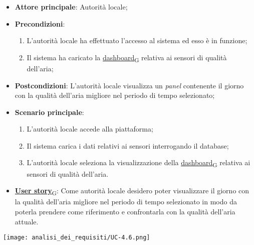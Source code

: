\begin{itemize}
	\item \textbf{Attore principale}: Autorità locale;
	\item \textbf{Precondizioni}:
	      \begin{enumerate}
		      \item L'autorità locale ha effettuato l'accesso al sistema ed esso è in funzione;
		      \item Il sistema ha caricato la \href{https://7last.github.io/docs/rtb/documentazione-interna/glossario\#dashboard}{dashboard\textsubscript{G}} relativa ai sensori di qualità dell'aria;
	      \end{enumerate}
	\item \textbf{Postcondizioni}: L'autorità locale visualizza un \textit{panel} contenente il giorno con la qualità dell'aria migliore nel periodo di tempo selezionato;
	\item \textbf{Scenario principale}:
	      \begin{enumerate}
		      \item L'autorità locale accede alla piattaforma;
		      \item Il sistema carica i dati relativi ai sensori interrogando il database;
		      \item L'autorità locale seleziona la visualizzazione della \href{https://7last.github.io/docs/rtb/documentazione-interna/glossario\#dashboard}{dashboard\textsubscript{G}} relativa ai sensori di qualità dell'aria.
	      \end{enumerate}
	\item \href{https://7last.github.io/docs/rtb/documentazione-interna/glossario\#user-story}{\textbf{User story}\textsubscript{G}}:
	      Come autorità locale desidero poter visualizzare il giorno con la qualità dell'aria migliore nel periodo di tempo selezionato
	      in modo da poterla prendere come riferimento e confrontarla con la qualità dell'aria attuale.
\end{itemize}
\begin{center}
	\texttt{[image: analisi\_dei\_requisiti/UC-4.6.png]}
\end{center}

